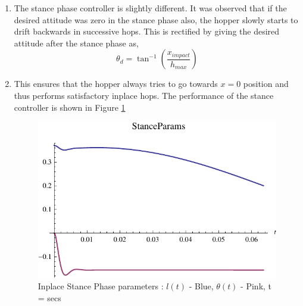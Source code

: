 \begin{enumerate}
  \item
  The stance phase controller is slightly different. It was observed that if the desired attitude was zero in the stance phase also, the hopper slowly starts to drift backwards in successive hops. This is rectified by giving the desired attitude after the stance phase as,
  \begin{equation}
   \theta_d = \tan^{-1}\left(\frac{x_{impact}}{h_{max}}\right)
  \end{equation}
  \item
  This ensures that the hopper always tries to go towards $x = 0$ position and thus performs satisfactory inplace hops. The performance of the stance controller is shown in Figure \ref{fig:4_inplace_stance_params}
  \begin{figure}[!htp]
\centering
\includegraphics[scale=1]{fig/inplace_pStance_params.pdf}
\caption{Inplace Stance Phase parameters : $l(t)$ - Blue, $\theta(t)$ - Pink, t = secs}
\label{fig:4_inplace_stance_params}
\end{figure}

\end{enumerate}

